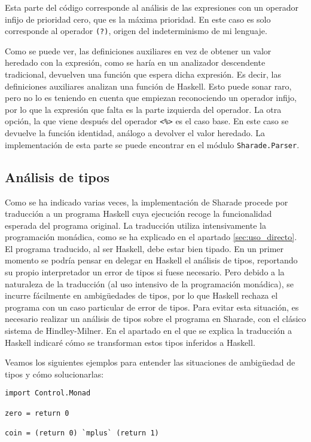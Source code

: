 \documentclass[class=article, crop=false]{standalone}
\begin{document}
Esta parte del código corresponde al análisis de las expresiones con un operador infijo de
prioridad cero, que es la máxima prioridad. En este caso es solo corresponde al operador
\verb`(?)`, origen del indeterminismo de mi lenguaje.

Como se puede ver, las definiciones auxiliares en vez de obtener un valor heredado con la
expresión, como se haría en un analizador descendente tradicional, devuelven una función que
espera dicha expresión. Es decir, las definiciones auxiliares analizan una función de
Haskell. Esto puede sonar raro, pero no lo es teniendo en cuenta que empiezan reconociendo un
operador infijo, por lo que la expresión que falta es la parte izquierda del operador. La
otra opción, la que viene después del operador \verb`<%>` es el caso base. En este caso se
devuelve la función identidad, análogo a devolver el valor heredado. La implementación de
esta parte se puede encontrar en el módulo \verb`Sharade.Parser`.

\subsection{Análisis de tipos}

Como se ha indicado varias veces, la implementación de Sharade procede por traducción a un
programa Haskell cuya ejecución recoge la funcionalidad esperada del programa original. La
traducción utiliza intensivamente la programación monádica, como se ha explicado en el
apartado \ref{sec:uso_directo}. El programa traducido, al ser Haskell, debe estar bien
tipado. En un primer momento se podría pensar en delegar en Haskell el análisis de tipos,
reportando su propio interpretador un error de tipos si fuese necesario. Pero debido a la
naturaleza de la traducción (al uso intensivo de la programación monádica), se incurre
fácilmente en ambigüedades de tipos, por lo que Haskell rechaza el programa con un caso
particular de error de tipos. Para evitar esta situación, es necesario realizar un análisis
de tipos sobre el programa en Sharade, con el clásico sistema de
Hindley-Milner\cite{hindley1969principal}. En el apartado en el que se explica la traducción
a Haskell indicaré cómo se transforman estos tipos inferidos a Haskell.

Veamos los siguientes ejemplos para entender las situaciones de ambigüedad de tipos y cómo
solucionarlas:

\begin{verbatim}
import Control.Monad

zero = return 0

coin = (return 0) `mplus` (return 1)
\end{verbatim}
\end{document}
